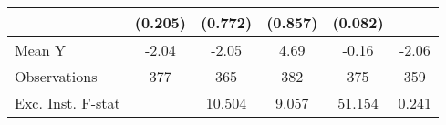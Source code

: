 {\begin{tabular}{l*{5}{c}}
            &     (0.205)         &     (0.772)         &     (0.857)         &     (0.082)         &                     \\
\midrule
Mean Y      &       -2.04         &       -2.05         &        4.69         &       -0.16         &       -2.06         \\
Observations&         377         &         365         &         382         &         375         &         359         \\
Exc. Inst. F-stat&                     &      10.504         &       9.057         &      51.154         &       0.241         \\
\bottomrule
\end{tabular}
}

